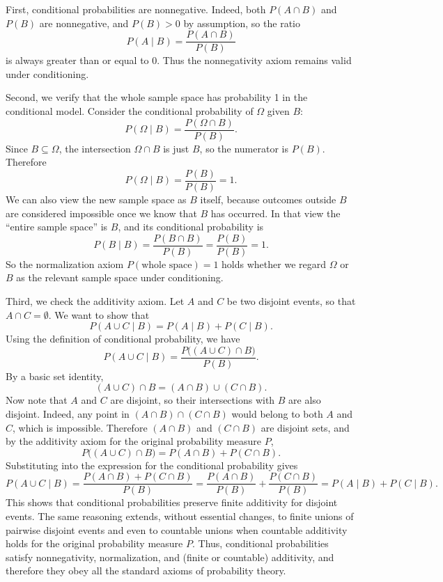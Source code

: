 First, conditional probabilities are nonnegative. Indeed, both \(P(A \cap B)\) and \(P(B)\) are nonnegative, and \(P(B) > 0\) by assumption, so the ratio
\[
P(A \mid B) = \frac{P(A \cap B)}{P(B)}
\]
is always greater than or equal to 0. Thus the nonnegativity axiom remains valid under conditioning.

Second, we verify that the whole sample space has probability 1 in the conditional model. Consider the conditional probability of \(\Omega\) given \(B\):
\[
P(\Omega \mid B) = \frac{P(\Omega \cap B)}{P(B)}.
\]
Since \(B \subseteq \Omega\), the intersection \(\Omega \cap B\) is just \(B\), so the numerator is \(P(B)\). Therefore
\[
P(\Omega \mid B) = \frac{P(B)}{P(B)} = 1.
\]
We can also view the new sample space as \(B\) itself, because outcomes outside \(B\) are considered impossible once we know that \(B\) has occurred. In that view the “entire sample space” is \(B\), and its conditional probability is
\[
P(B \mid B) = \frac{P(B \cap B)}{P(B)} = \frac{P(B)}{P(B)} = 1.
\]
So the normalization axiom \(P(\text{whole space}) = 1\) holds whether we regard \(\Omega\) or \(B\) as the relevant sample space under conditioning.

Third, we check the additivity axiom. Let \(A\) and \(C\) be two disjoint events, so that \(A \cap C = \emptyset\). We want to show that
\[
P(A \cup C \mid B) = P(A \mid B) + P(C \mid B).
\]
Using the definition of conditional probability, we have
\[
P(A \cup C \mid B)
= \frac{P\big((A \cup C) \cap B\big)}{P(B)}.
\]
By a basic set identity,
\[
(A \cup C) \cap B = (A \cap B) \cup (C \cap B).
\]
Now note that \(A\) and \(C\) are disjoint, so their intersections with \(B\) are also disjoint. Indeed, any point in \((A \cap B) \cap (C \cap B)\) would belong to both \(A\) and \(C\), which is impossible. Therefore \((A \cap B)\) and \((C \cap B)\) are disjoint sets, and by the additivity axiom for the original probability measure \(P\),
\[
P\big((A \cup C) \cap B\big)
= P(A \cap B) + P(C \cap B).
\]
Substituting into the expression for the conditional probability gives
\[
P(A \cup C \mid B)
= \frac{P(A \cap B) + P(C \cap B)}{P(B)}
= \frac{P(A \cap B)}{P(B)} + \frac{P(C \cap B)}{P(B)}
= P(A \mid B) + P(C \mid B).
\]
This shows that conditional probabilities preserve finite additivity for disjoint events. The same reasoning extends, without essential changes, to finite unions of pairwise disjoint events and even to countable unions when countable additivity holds for the original probability measure \(P\). Thus, conditional probabilities satisfy nonnegativity, normalization, and (finite or countable) additivity, and therefore they obey all the standard axioms of probability theory.

